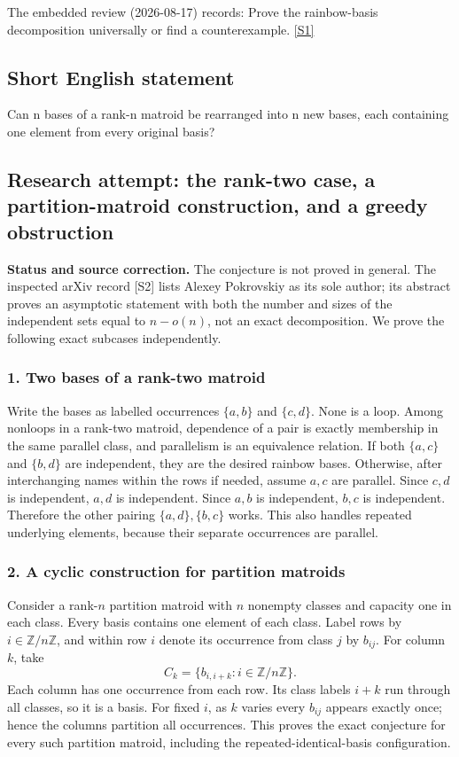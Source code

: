 \documentclass[11pt,a4paper]{article}
\newcommand{\sref}[2]{\hyperlink{source:#1:#2}{[S#2]}}
\begin{document}
The embedded review (2026-08-17) records: Prove the rainbow-basis decomposition universally or find a counterexample. \sref{statement}{1}

\subsection{Short English statement}

Can n bases of a rank-n matroid be rearranged into n new bases, each containing one element from every original basis?

\subsection{Research attempt: the rank-two case, a partition-matroid construction, and a greedy obstruction}
\textbf{Status and source correction.} The conjecture is not proved in general. The inspected arXiv record [S2] lists Alexey Pokrovskiy as its sole author; its abstract proves an asymptotic statement with both the number and sizes of the independent sets equal to $n-o(n)$, not an exact decomposition. We prove the following exact subcases independently.

\subsubsection{1. Two bases of a rank-two matroid}
Write the bases as labelled occurrences $\{a,b\}$ and $\{c,d\}$. None is a loop. Among nonloops in a rank-two matroid, dependence of a pair is exactly membership in the same parallel class, and parallelism is an equivalence relation. If both $\{a,c\}$ and $\{b,d\}$ are independent, they are the desired rainbow bases. Otherwise, after interchanging names within the rows if needed, assume $a,c$ are parallel. Since $c,d$ is independent, $a,d$ is independent. Since $a,b$ is independent, $b,c$ is independent. Therefore the other pairing $\{a,d\},\{b,c\}$ works. This also handles repeated underlying elements, because their separate occurrences are parallel.

\subsubsection{2. A cyclic construction for partition matroids}
Consider a rank-$n$ partition matroid with $n$ nonempty classes and capacity one in each class. Every basis contains one element of each class. Label rows by $i\in\mathbb Z/n\mathbb Z$, and within row $i$ denote its occurrence from class $j$ by $b_{ij}$. For column $k$, take
\[C_k=\{b_{i,i+k}:i\in\mathbb Z/n\mathbb Z\}.
\]
Each column has one occurrence from each row. Its class labels $i+k$ run through all classes, so it is a basis. For fixed $i$, as $k$ varies every $b_{ij}$ appears exactly once; hence the columns partition all occurrences. This proves the exact conjecture for every such partition matroid, including the repeated-identical-basis configuration.
\end{document}

